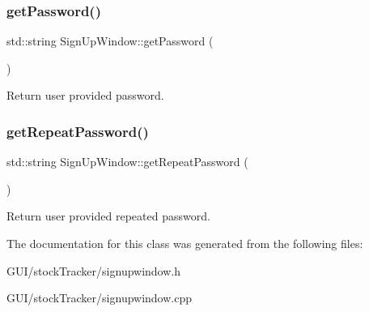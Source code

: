\subsubsection{\texorpdfstring{get\+Password()}{getPassword()}}
{\footnotesize\ttfamily std\+::string Sign\+Up\+Window\+::get\+Password (\begin{DoxyParamCaption}{ }\end{DoxyParamCaption})}

Return user provided password. \mbox{\label{class_sign_up_window_aaf6fae547c07d475b902e9aa6a2c7749}} 
\subsubsection{\texorpdfstring{get\+Repeat\+Password()}{getRepeatPassword()}}
{\footnotesize\ttfamily std\+::string Sign\+Up\+Window\+::get\+Repeat\+Password (\begin{DoxyParamCaption}{ }\end{DoxyParamCaption})}

Return user provided repeated password. 

The documentation for this class was generated from the following files\+:\begin{DoxyCompactItemize}
\item 
G\+U\+I/stock\+Tracker/signupwindow.\+h\item 
G\+U\+I/stock\+Tracker/signupwindow.\+cpp\end{DoxyCompactItemize}
